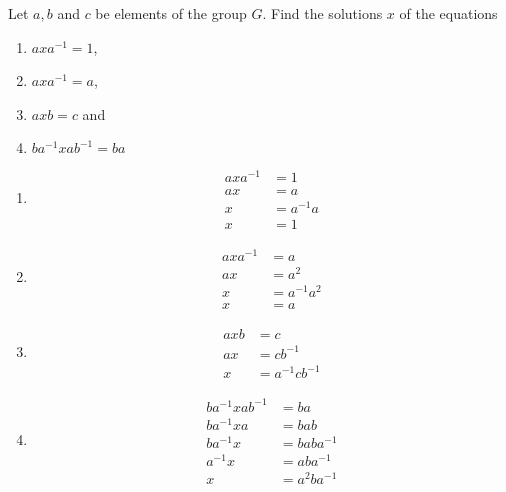 \begin{exercise}
    Let \(a, b\) and \(c\) be elements of the group \(G\). Find the solutions \(x\) of the equations
    \begin{enumerate}
        \item \(axa^{ - 1} = 1\),
        \item \(axa^{ - 1} = a\),
        \item \(axb = c\) and
        \item \(ba^{ - 1}xab^{ - 1} = ba\)
    \end{enumerate}
\end{exercise}
\begin{solution}\itemfix
    \begin{enumerate}
        \item \begin{align*}
                  axa^{ - 1} & = 1         \\
                  ax         & = a         \\
                  x          & = a^{ - 1}a \\
                  x          & = 1
              \end{align*}
        \item \begin{align*}
                  axa^{ - 1} & = a           \\
                  ax         & = a^2         \\
                  x          & = a^{ - 1}a^2 \\
                  x          & = a
              \end{align*}
        \item \begin{align*}
                  axb & = c                  \\
                  ax  & = cb^{ - 1}          \\
                  x   & = a^{ - 1}c b^{ - 1}
              \end{align*}
        \item \begin{align*}
                  ba^{ - 1}xab^{ - 1} & = ba           \\
                  ba^{ - 1}xa         & = bab          \\
                  ba^{ - 1}x          & = baba^{ - 1}  \\
                  a^{ - 1}x           & = aba^{ - 1}   \\
                  x                   & = a^2ba^{ - 1}
              \end{align*}
    \end{enumerate}
\end{solution}

